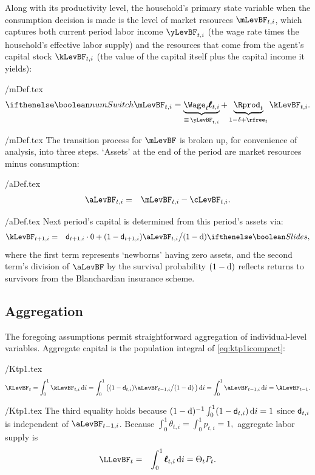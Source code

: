 \documentclass[titlepage]{\econtex}
\begin{document}
Along with its productivity level, the household's primary state variable when the consumption decision is made is the level of market resources $\mLevBF_{t,i}$, which captures both current period labor income $\yLevBF_{t,i}$ (the wage rate times the household's effective labor supply) and the resources that come from the agent's capital stock $\kLevBF_{t,i}$ (the value of the capital itself plus the capital income it yields):
\begin{verbatimwrite}{\eq/mDef.tex}
\begin{equation}
\ifnumSw \mLevBF_{t,i} = \underbrace{{\bf \Wage}_{t} \pmb{\ell}_{t,i}}_{\equiv\,\yLevBF_{t,i}} + \underbrace{{\Rprod}_t}_{1-\delta+\rfree_{t}} \kLevBF_{t,i}.
\label{eq:mDef}
\end{equation}
\end{verbatimwrite}
 \eq/mDef.tex
The transition process for $\mLevBF$ is broken up, for convenience
of analysis, into three steps.  `Assets' at the end of the period are
market resources minus consumption:
\begin{verbatimwrite}{\eq/aDef.tex}
\begin{eqnarray}
   \aLevBF_{t,i} & = & \mLevBF_{t,i}-\cLevBF_{t,i}. \label{eq:aDef}
\end{eqnarray}
\end{verbatimwrite}
 \eq/aDef.tex
Next period's capital is determined from this period's assets via:
\begin{eqnarray}
\kLevBF_{t+1,i} & = & \pDies_{t+1,i} \cdot 0+ (1 - \pDies_{t+1,i})\aLevBF_{t,i} \big/\PLives \label{eq:ktp1icompact}
\ifslides{}{,}
\end{eqnarray}
where the first term represents `newborns' having zero assets, and the second term's division of $\aLevBF$ by the survival probability $(1-\mathrm{d})$ reflects returns to survivors from the Blanchardian insurance scheme.


\subsection{Aggregation}

The foregoing assumptions permit straightforward aggregation of individual-level variables.  Aggregate capital is the population integral of \eqref{eq:ktp1icompact}:
\begin{verbatimwrite}{\eq/Ktp1.tex}
\begin{equation}
\KLevBF_{t} = \int_{0}^{1} \kLevBF_{t,i}\,\text{d}i = \int_{0}^{1} \big((1 - \pDies_{t,i})\aLevBF_{t-1,i} \big/\PLives\, \big)\,\text{d}i = \int_{0}^{1} \aLevBF_{t-1,i}\,\text{d}i = \ALevBF_{t-1}.   \label{eq:Ktp1}
\end{equation}
\end{verbatimwrite}
 \eq/Ktp1.tex
The third equality holds because $(1-\mathrm{d})^{-1}\int_{0}^{1}(1-\mathsf{d}_{t,i})\,\text{d}i = 1$
since $\mathsf{d}_{t,i}$ is independent of $\aLevBF_{t-1,i}$.
Because $\int_{0}^{1} \theta_{t,i} = \int_{0}^{1} {p}_{t,i} = 1,$ aggregate labor supply
is
\begin{eqnarray}
  \label{eq:Lt}
  \LLevBF_{t} & = & \int_{0}^{1} \pmb{\ell}_{t,i}\,\text{d}i = \Theta_{t} {P}_{t}.
\end{eqnarray}
\end{document}
